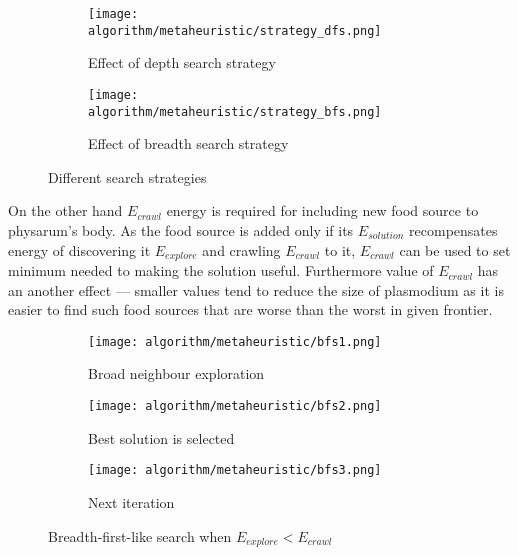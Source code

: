 \begin{figure}
  \centering

  \begin{subfigure}{0.47\textwidth}
    \centering
    \texttt{[image: algorithm/metaheuristic/strategy\_dfs.png]}
    \caption{Effect of depth search strategy}
  \end{subfigure}
  \begin{subfigure}{0.47\textwidth}
    \centering
    \texttt{[image: algorithm/metaheuristic/strategy\_bfs.png]}
    \caption{Effect of breadth search strategy}
  \end{subfigure}

  \caption{Different search strategies}
  \label{figure:m_strategy}
\end{figure}

On the other hand $E_{crawl}$ energy is required for including new food source to physarum's body. As the food source is added only if its $E_{solution}$ recompensates energy of discovering it $E_{explore}$ and crawling $E_{crawl}$ to it, $E_{crawl}$ can be used to set minimum needed to making the solution useful. Furthermore value of $E_{crawl}$ has an another effect --- smaller values tend to reduce the size of plasmodium as it is easier to find such food sources that are worse than the worst in given frontier.

\begin{figure}
  \centering

  \begin{subfigure}{0.3\textwidth}
    \centering
    \texttt{[image: algorithm/metaheuristic/bfs1.png]}
    \caption{Broad neighbour exploration}
  \end{subfigure}
  \begin{subfigure}{0.3\textwidth}
    \centering
    \texttt{[image: algorithm/metaheuristic/bfs2.png]}
    \caption{Best solution is selected}
  \end{subfigure}
  \begin{subfigure}{0.3\textwidth}
    \centering
    \texttt{[image: algorithm/metaheuristic/bfs3.png]}
    \caption{Next iteration}
  \end{subfigure}

  \caption{Breadth-first-like search when $E_{explore} < E_{crawl}$}
  \label{figure:m_explore_bfs}
\end{figure}

